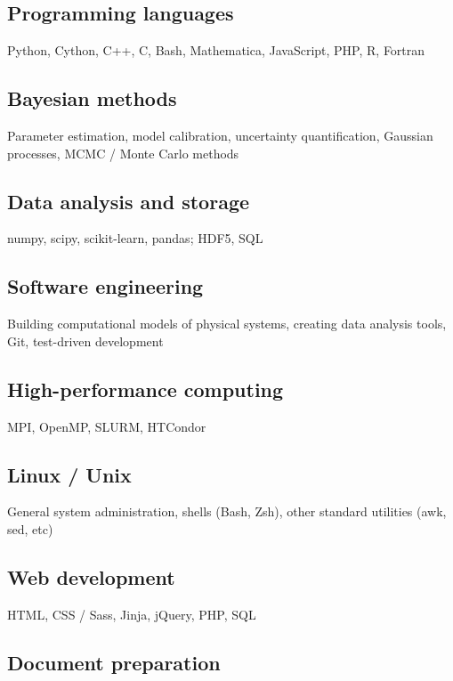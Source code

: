 \documentclass[letterpaper,10pt]{article}
\begin{document}
\begin{multicols}{2}
\subsection{Programming languages}

Python, Cython, C++, C, Bash, Mathematica, JavaScript, PHP, R, Fortran

\subsection{Bayesian methods}

Parameter estimation, model calibration, uncertainty quantification, Gaussian processes, MCMC / Monte Carlo methods

\subsection{Data analysis and storage}

numpy, scipy, scikit-learn, pandas;
HDF5, SQL

\subsection{Software engineering}

Building computational models of physical systems, creating data analysis tools, Git, test-driven development

\subsection{High-performance computing}

MPI, OpenMP, SLURM, HTCondor

\subsection{Linux / Unix}

General system administration, shells (Bash, Zsh), other standard utilities (awk, sed, etc)

\subsection{Web development}

HTML, CSS / Sass, Jinja, jQuery, PHP, SQL

\subsection{Document preparation}


\end{multicols}
\end{document}
